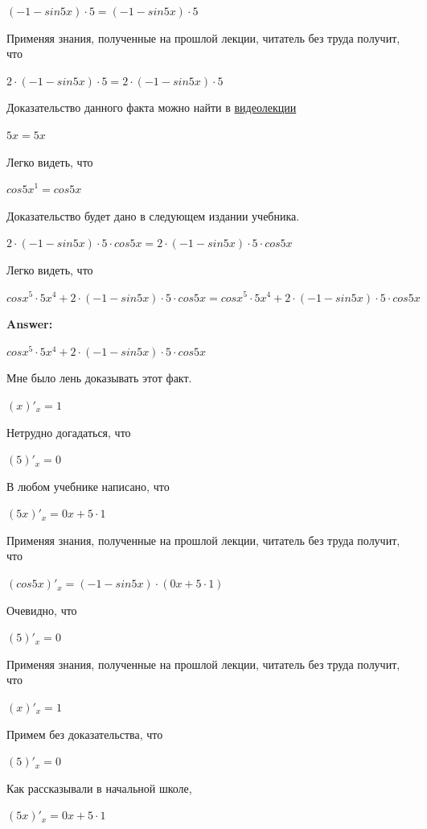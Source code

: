\documentclass[12pt,a4paper,fleqn]{article}
\theoremstyle{definition}
\begin{document}
$( -1  - sin 5  x ) \cdot  5  = ( -1  - sin 5  x ) \cdot  5 $

Применяя знания, полученные на прошлой лекции, читатель без труда получит, что 

$ 2  \cdot ( -1  - sin 5  x ) \cdot  5  =  2  \cdot ( -1  - sin 5  x ) \cdot  5 $

Доказательство данного факта можно найти в \href{https://www.youtube.com/watch?v=dQw4w9WgXcQ}{видеолекции} 

$ 5  x  =  5  x $

Легко видеть, что 

${cos 5  x }^{ 1 } = cos 5  x $

Доказательство будет дано в следующем издании учебника. 

$ 2  \cdot ( -1  - sin 5  x ) \cdot  5  \cdot cos 5  x  =  2  \cdot ( -1  - sin 5  x ) \cdot  5  \cdot cos 5  x $

Легко видеть, что 

$cos{ x }^{ 5 } \cdot  5 { x }^{ 4 } +  2  \cdot ( -1  - sin 5  x ) \cdot  5  \cdot cos 5  x  = cos{ x }^{ 5 } \cdot  5 { x }^{ 4 } +  2  \cdot ( -1  - sin 5  x ) \cdot  5  \cdot cos 5  x $


\textbf{Answer:}

$cos{ x }^{ 5 } \cdot  5 { x }^{ 4 } +  2  \cdot ( -1  - sin 5  x ) \cdot  5  \cdot cos 5  x $

Мне было лень доказывать этот факт.

$( x )'_{x} =  1 $

Нетрудно догадаться, что 

$( 5 )'_{x} =  0 $

В любом учебнике написано, что 

$( 5  x )'_{x} =  0  x  +  5  \cdot  1 $

Применяя знания, полученные на прошлой лекции, читатель без труда получит, что 

$(cos 5  x )'_{x} = ( -1  - sin 5  x ) \cdot ( 0  x  +  5  \cdot  1 )$

Очевидно, что 

$( 5 )'_{x} =  0 $

Применяя знания, полученные на прошлой лекции, читатель без труда получит, что 

$( x )'_{x} =  1 $

Примем без доказательства, что 

$( 5 )'_{x} =  0 $

Как рассказывали в начальной школе, 

$( 5  x )'_{x} =  0  x  +  5  \cdot  1 $
\end{document}
